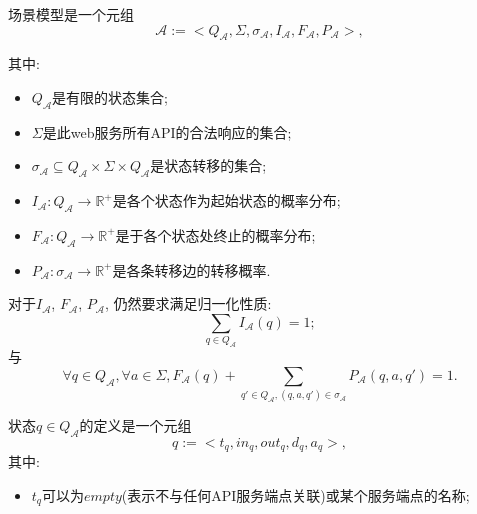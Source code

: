         \begin{definition}
            \label{def:our}
            场景模型是一个元组
            \begin{equation}
                 \mathcal{A} := <Q_{\mathcal{A}}, \Sigma, \sigma_{\mathcal{A}}, I_{\mathcal{A}}, F_{\mathcal{A}}, P_{\mathcal{A}}>,
            \end{equation}
            
            其中:
            \begin{itemize}
                \item $Q_{\mathcal{A}}$是有限的状态集合;
                
                \item $\Sigma$是此web服务所有API的合法响应的集合;
                
                \item $\sigma_{\mathcal{A}} \subseteq Q_{\mathcal{A}} \times \Sigma \times Q_{\mathcal{A}}$是状态转移的集合;
                
                \item $I_{\mathcal{A}} : Q_{\mathcal{A}} \to \mathbb{R}^{+}$是各个状态作为起始状态的概率分布;
                
                \item $F_{\mathcal{A}} : Q_{\mathcal{A}} \to \mathbb{R}^{+}$是于各个状态处终止的概率分布;
                
                \item $P_{\mathcal{A}}: \sigma_{\mathcal{A}} \to \mathbb{R}^{+}$是各条转移边的转移概率.
            \end{itemize}
            
            对于$I_{\mathcal{A}}$, $F_{\mathcal{A}}$, $P_{\mathcal{A}}$, 仍然要求满足归一化性质:
            \begin{equation}
                \label{eq:model_normal1}
                \sum_{q \in Q_{\mathcal{A}}} I_{\mathcal{A}}(q) = 1;
            \end{equation}
            与
            \begin{equation}
                \label{eq:model_normal2}
                \forall q \in Q_{\mathcal{A}}, \forall a \in \Sigma, F_{\mathcal{A}}(q) + \sum_{q' \in Q_{\mathcal{A}}, (q,a,q') \in \sigma_{\mathcal{A}}} P_{\mathcal{A}}(q,a,q') = 1.
            \end{equation}
            
            状态$q \in Q_{\mathcal{A}}$的定义是一个元组
            \begin{equation}
                q := <t_q, in_q, out_q, d_q, a_q>,
            \end{equation}
            其中:
            \begin{itemize}
                \item $t_q$可以为$empty$(表示不与任何API服务端点关联)或某个服务端点的名称;
                

\end{itemize}
\end{definition}
